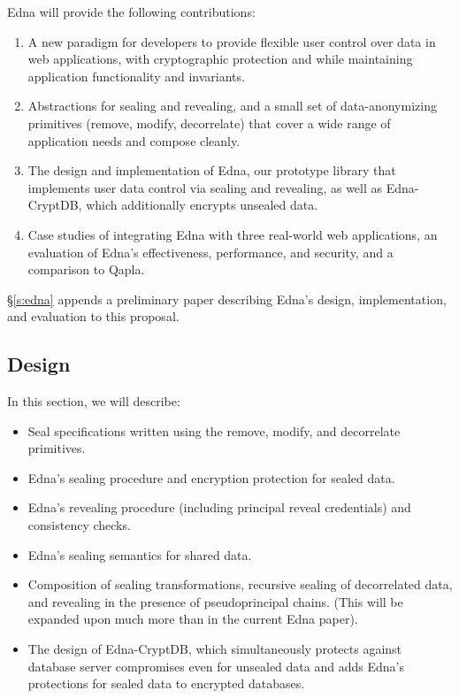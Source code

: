 \label{sec:intro:contrib}
Edna will provide the following contributions:
\begin{enumerate}[nosep] 
    \item A new paradigm for developers to provide flexible user control over data in web applications, with cryptographic protection and while maintaining application functionality and invariants.
    \item Abstractions for sealing and revealing, and a small set of data-anonymizing primitives (remove, modify, decorrelate) that cover a wide range of application needs and compose cleanly.
    \item The design and implementation of Edna, our prototype library that implements user data control via sealing and revealing, as well as Edna-CryptDB, which additionally encrypts unsealed data.
    \item Case studies of integrating Edna with three real-world web applications, an evaluation of Edna's effectiveness, performance, and security, and a comparison to Qapla.
\end{enumerate}
%
\S\ref{s:edna} appends a preliminary paper describing Edna's design, implementation, and
evaluation to this proposal.

\iffalse
\subsection{Design}
In this section, we will describe:
\begin{itemize}[nosep]
    \item Seal specifications written using the remove, modify, and decorrelate primitives.
    \item Edna's sealing procedure and encryption protection for sealed data.
    \item Edna's revealing procedure (including principal reveal credentials) and consistency checks.
    \item Edna's sealing semantics for shared data.
    \item Composition of sealing transformations, recursive sealing of
        decorrelated data, and revealing in the presence of pseudoprincipal
        chains. (This will be expanded upon much more than in the current Edna
        paper).
    \item The design of Edna-CryptDB, which simultaneously protects against database server compromises even for
unsealed data and adds Edna's protections for sealed data to encrypted
        databases.
\end{itemize}

